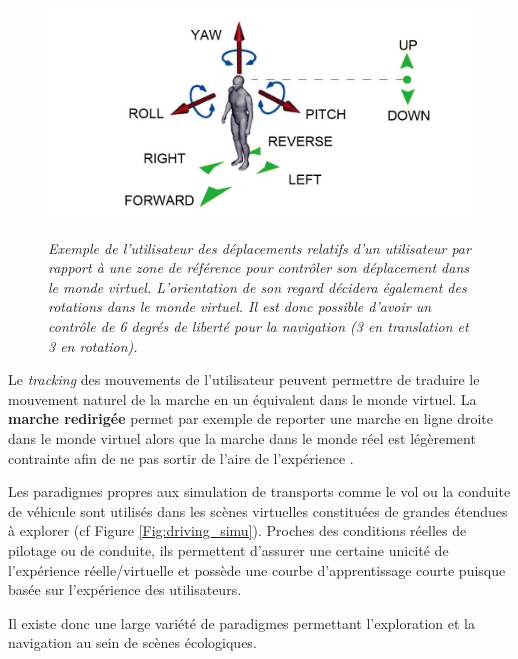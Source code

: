 \begin{figure}[h]
 \centering
 {\includegraphics[width=0.8\linewidth]{./figures/ch3/HCNav}}
   \caption{\it Exemple de l'utilisateur des déplacements relatifs d'un utilisateur par rapport à une zone de référence pour contrôler son déplacement dans le monde virtuel. L'orientation de son regard décidera également des rotations dans le monde virtuel. Il est donc possible d'avoir un contrôle de 6 degrés de liberté pour la navigation (3 en translation et 3 en rotation).}
   \label{Fig:HCNAV}
 \hspace{0.3cm}
\end{figure}

Le \textit{tracking} des mouvements de l'utilisateur peuvent permettre de traduire le mouvement naturel de la marche en un équivalent dans le monde virtuel. La \textbf{marche redirigée} permet par exemple de reporter une marche en ligne droite dans le monde virtuel alors que la marche dans le monde réel est légèrement contrainte afin de ne pas sortir de l'aire de l'expérience \cite{bruder_redirecting_2012}.

Les paradigmes propres aux simulation de transports comme le vol ou la conduite de véhicule sont utilisés dans les scènes virtuelles constituées de grandes étendues à explorer (cf Figure \ref{Fig:driving_simu}). Proches des conditions réelles de pilotage ou de conduite, ils permettent d'assurer une certaine unicité de l'expérience réelle/virtuelle et possède une courbe d'apprentissage courte puisque basée sur l'expérience des utilisateurs.

Il existe donc une large variété de paradigmes permettant l'exploration et la navigation au sein de scènes écologiques. 


